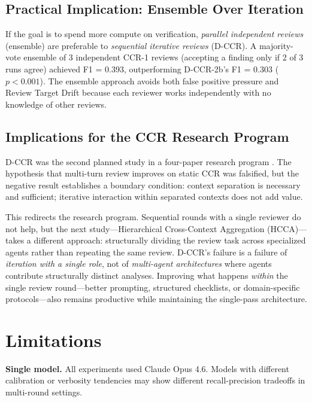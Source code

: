 \documentclass[11pt]{article}
\begin{document}
\subsection{Practical Implication: Ensemble Over Iteration}

If the goal is to spend more compute on verification, \emph{parallel independent reviews} (ensemble) are preferable to \emph{sequential iterative reviews} (D-CCR).
A majority-vote ensemble of 3 independent CCR-1 reviews (accepting a finding only if 2 of 3 runs agree) achieved F1 = 0.393, outperforming D-CCR-2b's F1 = 0.303 ($p < 0.001$).
The ensemble approach avoids both false positive pressure and Review Target Drift because each reviewer works independently with no knowledge of other reviews.

\subsection{Implications for the CCR Research Program}

D-CCR was the second planned study in a four-paper research program \citep[Section 8]{song2026ccr}.
The hypothesis that multi-turn review improves on static CCR was falsified, but the negative result establishes a boundary condition: context separation is necessary and sufficient; iterative interaction within separated contexts does not add value.

This redirects the research program.
Sequential rounds with a single reviewer do not help, but the next study---Hierarchical Cross-Context Aggregation (HCCA)---takes a different approach: structurally dividing the review task across specialized agents rather than repeating the same review.
D-CCR's failure is a failure of \emph{iteration with a single role}, not of \emph{multi-agent architectures} where agents contribute structurally distinct analyses.
Improving what happens \emph{within} the single review round---better prompting, structured checklists, or domain-specific protocols---also remains productive while maintaining the single-pass architecture.

\section{Limitations}

\textbf{Single model.} All experiments used Claude Opus 4.6. Models with different calibration or verbosity tendencies may show different recall-precision tradeoffs in multi-round settings.
\end{document}
